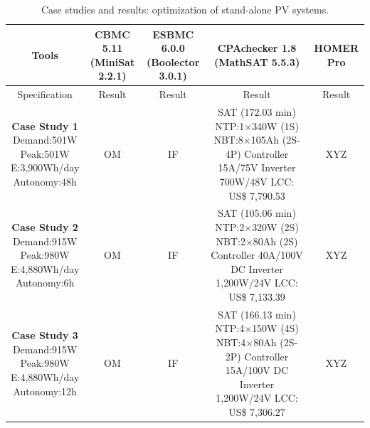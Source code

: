 \documentclass[review]{elsarticle}
\begin{document}
\begin{table}
\caption{Case studies and results: optimization of stand-alone PV systems.}\label{tab1}
\begin{scriptsize}
\begin{tabular}{|c|c|c|c|c|}
\hline
\hline
Tools & \makecell{CBMC 5.11 \\(MiniSat 2.2.1)} & \makecell{ESBMC 6.0.0 \\(Boolector 3.0.1)} & \makecell{CPAchecker 1.8\\(MathSAT 5.5.3)} & HOMER Pro \\
\hline
\hline
Specification & Result & Result & Result & Result \\
\hline
\makecell{\textbf{Case Study 1}\\Demand:501W\\Peak:501W \\E:3,900Wh/day\\Autonomy:48h} & OM & IF & \makecell{SAT (172.03 min) \\NTP:1$\times$340W (1S)\\NBT:8$\times$105Ah (2S-4P)\\Controller 15A/75V\\Inverter 700W/48V\\LCC: US\$ 7,790.53} & XYZ \\
\hline
\makecell{\textbf{Case Study 2}\\Demand:915W\\Peak:980W\\E:4,880Wh/day\\Autonomy:6h} & OM & IF & \makecell {SAT (105.06 min) \\NTP:2$\times$320W (2S)\\NBT:2$\times$80Ah (2S)\\Controller 40A/100V DC\\Inverter 1,200W/24V \\LCC: US\$ 7,133.39} & XYZ \\
\hline
\makecell{\textbf{Case Study 3}\\Demand:915W\\Peak:980W\\E:4,880Wh/day\\Autonomy:12h} & OM & IF & \makecell {SAT (166.13 min) \\NTP:4$\times$150W (4S)\\NBT:4$\times$80Ah (2S-2P)\\Controller 15A/100V DC\\Inverter 1,200W/24V \\LCC: US\$ 7,306.27} & XYZ \\

\end{tabular}
\end{scriptsize}
\end{table}
\end{document}
